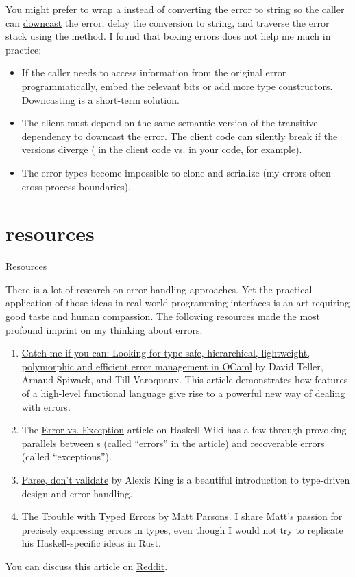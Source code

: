 \documentclass{article}
\begin{document}
You might prefer to wrap a  instead of converting the error to string so the caller can \href{https://doc.rust-lang.org/1.62.0/std/error/trait.Error.html#method.downcast}{downcast} the error, delay the conversion to string, and traverse the error stack using the \href{https://doc.rust-lang.org/1.62.0/std/error/trait.Error.html#method.source}{} method.
I found that boxing errors does not help me much in practice:
\begin{itemize}
  \item
    If the caller needs to access information from the original error programmatically, embed the relevant bits or add more type constructors.
    Downcasting is a short-term solution.
  \item
    The client must depend on the same semantic version of the transitive dependency to downcast the error.
    The client code can silently break if the versions diverge ( in the client code vs.  in your code, for example).
  \item
    The error types become impossible to clone and serialize (my errors often cross process boundaries).
\end{itemize}

\section{resources}{Resources}

There is a lot of research on error-handling approaches.
Yet the practical application of those ideas in real-world programming interfaces is an art requiring good taste and human compassion.
The following resources made the most profound imprint on my thinking about errors.

\begin{enumerate}
  \item
    \href{https://web.archive.org/web/20110818020758/http://www.univ-orleans.fr/lifo/Members/David.Teller/publications/ml2008.pdf}{Catch me if you can: Looking for type-safe, hierarchical, lightweight, polymorphic and efficient error management in OCaml} by David Teller, Arnaud Spiwack, and Till Varoquaux.
    This article demonstrates how features of a high-level functional language give rise to a powerful new way of dealing with errors.
  \item
    The \href{https://wiki.haskell.org/Error_vs._Exception}{Error vs. Exception} article on Haskell Wiki has a few through-provoking parallels between s (called ``errors'' in the article) and recoverable errors (called ``exceptions'').
  \item
    \href{https://lexi-lambda.github.io/blog/2019/11/05/parse-don-t-validate/}{Parse, don't validate} by Alexis King is a beautiful introduction to type-driven design and error handling.
  \item
    \href{https://www.parsonsmatt.org/2018/11/03/trouble_with_typed_errors.html}{The Trouble with Typed Errors} by Matt Parsons.
    I share Matt's passion for precisely expressing errors in types, even though I would not try to replicate his Haskell-specific ideas in Rust.
\end{enumerate}

You can discuss this article on \href{https://www.reddit.com/r/rust/comments/yvdz6l/blog_post_designing_error_types_in_rust}{Reddit}.
\end{document}
